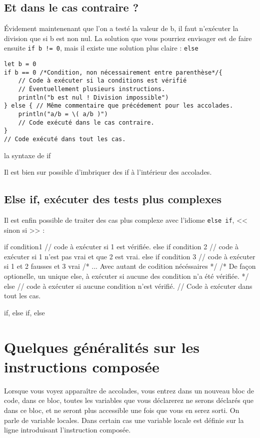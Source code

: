 \subsection{Et dans le cas contraire ?}
Évidement maintenenant que l'on  a testé la valeur de b, il faut n'exécuter la division que si b est non nul.
La solution que vous pourriez envisager est de faire ensuite
\texttt{if b != 0},
mais il existe une solution plus claire : \texttt{else}
\begin{listing}[h]
\begin{verbatim}
let b = 0
if b == 0 /*Condition, non nécessairement entre parenthèse*/{
    // Code à exécuter si la conditions est vérifié
    // Éventuellement plusieurs instructions.
    println("b est nul ! Division impossible")
} else { // Même commentaire que précédement pour les accolades.
    println("a/b = \( a/b )")
    // Code exécuté dans le cas contraire.
}
// Code exécuté dans tout les cas.
\end{verbatim}
\caption{la syntaxe de if}
\end{listing} %

Il est bien sur possible d'imbriquer des if à l'intérieur des accolades.
\subsection{Else if, exécuter des tests plus complexes}
Il est enfin possible de traiter des cas plus complexe avec l'idiome \texttt{else if}, << sinon si >> :
\begin{listing}[h]
if condition1 {
    // code à exécuter si 1 est vérifiée.
}
else if condition 2
{
    // code à exécuter si 1 n'est pas vrai et que 2 est vrai.
} else if condition 3 {
    // code à exécuter si 1 et 2 fausses et 3 vrai 
}
/* ... Avec autant de codition nécéssaires */
/* De façon optionelle, un unique else, à exécuter si aucune des condition n'a été vérifiée. */
else {
    // code à exécuter si aucune  condition n'est vérifié.
}
// Code à exécuter dans tout les cas.

\caption{if, else if, else}
\end{listing}
\section{Quelques généralités sur les instructions composée}
Lorsque vous voyez apparaître de accolades, vous entrez dans un nouveau bloc de code, dans ce bloc, toutes les variables que vous déclarerez ne serons déclarés que dans ce bloc, et ne seront plus accessible une fois que vous en serez sorti. On parle de variable locales. Dans certain cas une variable locale est définie sur la ligne introduisant l'instruction composée.

